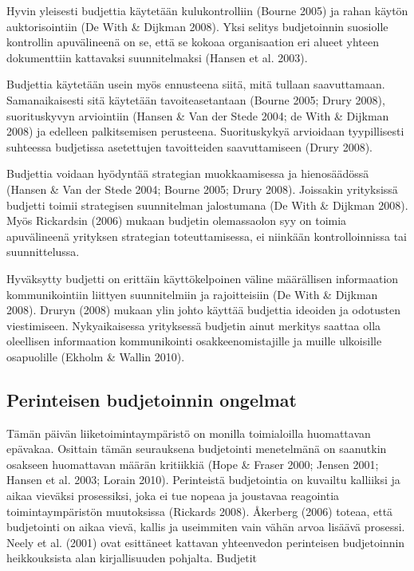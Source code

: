 \documentclass[12pt,a4paper,oneside,pdftex]{report}
\begin{document}
Hyvin yleisesti budjettia käytetään kulukontrolliin (Bourne 2005) ja rahan käytön auktorisointiin (De With & Dijkman 2008). Yksi selitys budjetoinnin suosiolle kontrollin apuvälineenä on se, että se kokoaa organisaation eri alueet yhteen dokumenttiin kattavaksi suunnitelmaksi (Hansen et al. 2003).

Budjettia käytetään usein myös ennusteena siitä, mitä tullaan saavuttamaan. Samanaikaisesti sitä käytetään tavoiteasetantaan (Bourne 2005; Drury 2008), suorituskyvyn arviointiin (Hansen & Van der Stede 2004; de With & Dijkman 2008) ja edelleen palkitsemisen perusteena. Suorituskykyä arvioidaan tyypillisesti suhteessa budjetissa asetettujen tavoitteiden saavuttamiseen (Drury 2008).

Budjettia voidaan hyödyntää strategian muokkaamisessa ja hienosäädössä (Hansen & Van der Stede 2004; Bourne 2005; Drury 2008). Joissakin yrityksissä budjetti toimii strategisen suunnitelman jalostumana (De With & Dijkman 2008). Myös Rickardsin (2006) mukaan budjetin olemassaolon syy on toimia apuvälineenä yrityksen strategian toteuttamisessa, ei niinkään kontrolloinnissa tai suunnittelussa.

Hyväksytty budjetti on erittäin käyttökelpoinen väline määrällisen informaation kommunikointiin liittyen suunnitelmiin ja rajoitteisiin (De With & Dijkman 2008). Druryn (2008) mukaan ylin johto käyttää budjettia ideoiden ja odotusten viestimiseen. Nykyaikaisessa yrityksessä budjetin ainut merkitys saattaa olla oleellisen informaation kommunikointi osakkeenomistajille ja muille ulkoisille osapuolille (Ekholm & Wallin 2010).

\subsection{Perinteisen budjetoinnin ongelmat}

Tämän päivän liiketoimintaympäristö on monilla toimialoilla huomattavan epävakaa. Osittain tämän seurauksena budjetointi menetelmänä on saanutkin osakseen huomattavan määrän kritiikkiä (Hope & Fraser 2000; Jensen 2001; Hansen et al. 2003; Lorain 2010). Perinteistä budjetointia on kuvailtu kalliiksi ja aikaa vieväksi prosessiksi, joka ei tue nopeaa ja joustavaa reagointia toimintaympäristön muutoksissa (Rickards 2008).  Åkerberg (2006) toteaa, että budjetointi on aikaa vievä, kallis ja useimmiten vain vähän arvoa lisäävä prosessi. Neely et al. (2001) ovat esittäneet kattavan yhteenvedon perinteisen budjetoinnin heikkouksista alan kirjallisuuden pohjalta. Budjetit
\end{document}
